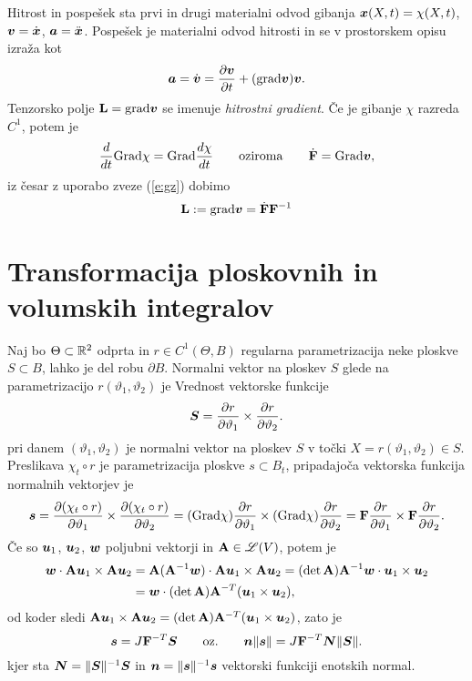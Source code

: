 \begin{primer} %
	Hitrost in pospešek sta prvi in drugi materialni odvod gibanja $\boldsymbol x(X,t)=\chi(X,t)$,
	$\boldsymbol v=\dot{\boldsymbol x}$, $\boldsymbol a=\ddot{\boldsymbol x}$.
	Pospešek je materialni odvod hitrosti in se v prostorskem opisu izraža kot
	\[ \boldsymbol a=\dot{\boldsymbol v}=\frac{\partial\boldsymbol v}{\partial t}+(\mathrm{grad}\boldsymbol v)\boldsymbol v. \]
	Tenzorsko polje $\mathbf L=\mathrm{grad}\boldsymbol v$ se imenuje \emph{hitrostni gradient}.
	Če je gibanje $\chi$ razreda $C^1$, potem je
	\[
		\frac{d}{dt}\mathrm{Grad}\chi=\mathrm{Grad}\frac{d\chi}{dt}\qquad\textrm{oziroma}\qquad
		\dot{\mathbf F}=\mathrm{Grad}\boldsymbol v,
	\]
	iz česar z uporabo zveze (\ref{e:gz}) dobimo
	\begin{equation} \label{e:L}
		\mathbf L:=\mathrm{grad}\boldsymbol v=\dot{\mathbf F}\mathbf F^{-1}
	\end{equation}
\end{primer}


\section{Transformacija ploskovnih in volumskih integralov}


Naj bo $\Theta\subset\mathbb R^2$ odprta in $r\in C^1(\Theta,B)$ regularna parametrizacija
neke ploskve $S\subset B$, lahko je del robu $\partial B$. Normalni vektor
na ploskev $S$ glede na parametrizacijo $r(\vartheta_1,\vartheta_2)$ je
Vrednost vektorske funkcije
\[
	\boldsymbol S=\frac{\partial r}{\partial\vartheta_1}\times
	\frac{\partial r}{\partial\vartheta_2}.
\]
pri danem $(\vartheta_1,\vartheta_2)$ je normalni vektor na ploskev $S$
v točki $X=r(\vartheta_1,\vartheta_2)\in S$.
Preslikava $\chi_t\circ r$ je parametrizacija ploskve $s\subset B_t$, pripadajoča
vektorska funkcija normalnih vektorjev je
\[
	\boldsymbol s=\frac{\partial(\chi_t\circ r)}{\partial\vartheta_1}\times
	\frac{\partial(\chi_t\circ r)}{\partial\vartheta_2}=
	(\mathrm{Grad}\chi)\frac{\partial r}{\partial\vartheta_1}\times
	(\mathrm{Grad}\chi)\frac{\partial r}{\partial\vartheta_2}=
	\mathbf F\frac{\partial r}{\partial\vartheta_1}\times
	\mathbf F\frac{\partial r}{\partial\vartheta_2}.
\]
Če so $\boldsymbol u_1$, $\boldsymbol u_2$, $\boldsymbol w$ poljubni vektorji in $\mathbf A\in\mathscr L(V)$, potem je
\begin{align*}
	\boldsymbol w\cdot\mathbf A\boldsymbol u_1\times\mathbf A\boldsymbol u_2&=
	\mathbf A(\mathbf A^{-1}\boldsymbol w)\cdot\mathbf A\boldsymbol u_1\times\mathbf A\boldsymbol u_2=
	(\det\mathbf A)\mathbf A^{-1}\boldsymbol w\cdot\boldsymbol u_1\times\boldsymbol u_2 \\
	&=\boldsymbol w\cdot (\det\mathbf A)\mathbf A^{-T}(\boldsymbol u_1\times\boldsymbol u_2),
\end{align*}
od koder sledi $\mathbf A\boldsymbol u_1\times\mathbf A\boldsymbol u_2=
(\det\mathbf A)\mathbf A^{-T}(\boldsymbol u_1\times\boldsymbol u_2)$, zato je
\begin{equation} \label{e:nsns}
	\boldsymbol s=J\mathbf F^{-T}\boldsymbol S\qquad\textrm{oz.}\qquad
	\boldsymbol n\|\boldsymbol s\|=J\mathbf F^{-T}\boldsymbol N\|\boldsymbol S\|.
\end{equation}
kjer sta $\boldsymbol N=\|\boldsymbol S\|^{-1}\boldsymbol S$ in $\boldsymbol n=\|\boldsymbol s\|^{-1}\boldsymbol s$
vektorski funkciji enotskih normal.

